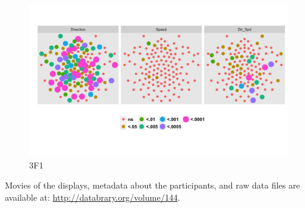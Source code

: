 \documentclass[landscape,final,paperwidth=72in,paperheight=42in,fontscale=0.285]{baposter}
\begin{document}
\begin{poster}
{\begin{figure}[H]
  \centering
  \includegraphics[scale=0.3]{../../figs/3F1/analyze-and-plot-main-effects-1.png}
  \caption{3F1}\label{analyze-and-plot-main-effects-1.png}
\end{figure}


    }

        {



        }

    {
       Movies of the displays, metadata about the participants, and raw data files are available at: \url{http://databrary.org/volume/144}.
     }  
     

\end{poster}
\end{document}
